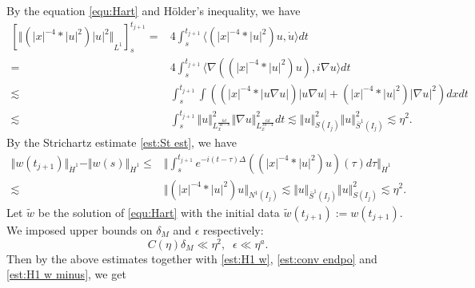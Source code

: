 \documentclass[reqno, 11pt]{amsart}
\numberwithin{equation}{section}
\theoremstyle{plain}
\theoremstyle{definition}
\numberwithin{equation}{section}
\numberwithin{theorem}{section}
\numberwithin{equation}{section}
\numberwithin{equation}{section}
\numberwithin{theorem}{section}
\begin{document}
	By the equation \eqref{equ:Hart} and Hölder's inequality, we have 
	\begin{equation}\label{est:conv endpo}
	\begin{aligned}
	[ {\Vert{\left(|x|^{-4}*|u|^2\right)|u|^2}\Vert}_{L^1} ]_{s}^{t_{j+1}}=&4\int_{s}^{t_{j+1}}\langle \left(|x|^{-4}*|u|^2\right)u,\dot{u} \rangle dt\\=&4\int_{s}^{t_{j+1}}\langle \nabla\left( \left(|x|^{-4}*|u|^2\right)u \right),i\nabla u \rangle dt\\\lesssim&\int_{s}^{t_{j+1}}\int\left( \left(|x|^{-4}*|u\nabla u|\right)|u\nabla u|+\left(|x|^{-4}*|u|^2\right)|\nabla u|^2 \right)dxdt\\\lesssim&\int_{s}^{t_{j+1}}\Vert u\Vert_{L_{x}^{\frac{6d}{3d-8}}}^2 \Vert\nabla u\Vert_{L_{x}^{\frac{6d}{3d-4}}}^2dt \lesssim \Vert u\Vert_{S(I_j)}^2 \Vert u\Vert_{\bar{S}^1(I_j)}^2\lesssim \eta^2.
	\end{aligned}
	\end{equation}
	By the Strichartz estimate \eqref{est:St est}, we have
	\begin{equation}\label{est:H1 w minus}
	\begin{aligned}
	\Vert w(t_{j+1})\Vert_{\dot{H}^1}-\Vert w(s)\Vert_{\dot{H}^1}\leq& \Vert\int_{s}^{t_{j+1}} e^{-i(t-\tau)\Delta}\left(\left(|x|^{-4}*|u|^2\right)u\right)(\tau)d\tau \Vert_{\dot H^1}\\\lesssim&\Vert\left(|x|^{-4}*|u|^2\right)u \Vert_{N^1(I_j)}\lesssim \Vert u\Vert_{\bar{S}^1(I_j)} \Vert u\Vert_{S(I_j)}^2 \lesssim \eta^2.
	\end{aligned}
	\end{equation} 
	Let $\widetilde{w}$ be the solution of \eqref{equ:Hart} with the initial data $\widetilde{w}(t_{j+1}):=w(t_{j+1})$. We imposed upper bounds on $\delta_{M}$ and $\epsilon$ respectively:
	\begin{equation}\label{con:scat 3} 
	C(\eta)\delta_{M}\ll \eta^2,\;\;\epsilon\ll\eta^a.
	\end{equation} 
	Then by the above estimates together with  \eqref{est:H1 w}, \eqref{est:conv endpo} and \eqref{est:H1 w minus}, we get
\end{document}
